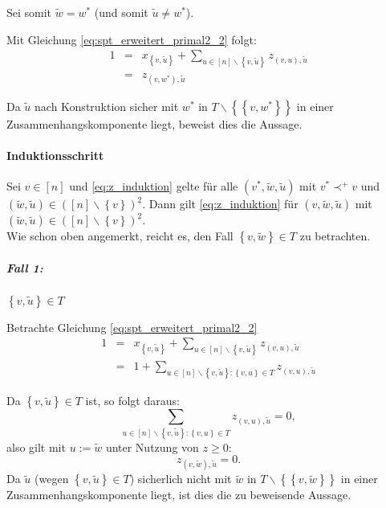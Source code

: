 \documentclass[10p,a4paper,BCOR = 12mm, DIV=15]{scrbook}
\begin{document}
{\begin{bew}
Sei somit $\widetilde{w} = w^*$ (und somit $\widetilde{u}\neq w^*$).

Mit Gleichung \eqref{eq:spt_erweitert_primal2_2} folgt:
\begin{eqnarray*}
1 & = & x_{\left\{v, \widetilde{u}\right\}} + \sum_{u\in[n]\backslash\left\{v, \widetilde{u}\right\}} z_{\left(v, u\right), \widetilde{u}} \\
& = & z_{\left(v, w^*\right), \widetilde{u}}
\end{eqnarray*}

Da $\widetilde{u}$ nach Konstruktion sicher mit $w^*$ in $T\backslash \left\{\left\{v, w^*\right\}\right\}$ in einer Zusammenhangskomponente liegt, beweist dies die Aussage.

\paragraph{Induktionsschritt} Sei $v\in \left[n\right]$ und \eqref{eq:z_induktion} gelte für alle $\left(v^*, \widetilde{w}, \widetilde{u}\right)$ mit $v^*\prec^+ v$ und $\left(\widetilde{w}, \widetilde{u}\right)\in \left(\left[n\right]\backslash \left\{v\right\}\right)^{\underline{2}}$. Dann gilt \eqref{eq:z_induktion} für $\left(v, \widetilde{w}, \widetilde{u}\right)$ mit $\left(\widetilde{w}, \widetilde{u}\right)\in \left(\left[n\right]\backslash \left\{v\right\}\right)^{\underline{2}}$. \\

Wie schon oben angemerkt, reicht es, den Fall $\left\{v, \widetilde{w}\right\}\in T$ zu betrachten.

\subparagraph{Fall 1:} $\left\{v, \widetilde{u}\right\}\in T$

Betrachte Gleichung \eqref{eq:spt_erweitert_primal2_2}
\begin{eqnarray*}
1 & = & x_{\left\{v, \widetilde{u}\right\}} + \sum_{u\in[n]\backslash\left\{v, \widetilde{u}\right\}} z_{\left(v, u\right), \widetilde{u}} \\
& = & 1 + \sum_{u\in[n]\backslash\left\{v, \widetilde{u}\right\}: \left\{v, u\right\}\in T} z_{\left(v, u\right), \widetilde{u}}
\end{eqnarray*}

Da $\left\{v, \widetilde{u}\right\}\in T$ ist, so folgt daraus:
\begin{displaymath}
\sum_{u\in[n]\backslash\left\{v, \widetilde{u}\right\}: \left\{v, u\right\}\in T} z_{\left(v, u\right), \widetilde{u}} = 0,
\end{displaymath}
also gilt mit $u:=\widetilde{w}$ unter Nutzung von $z\geq 0$:
\begin{displaymath}
z_{\left(v, \widetilde{w}\right), \widetilde{u}} = 0.
\end{displaymath}
Da $\widetilde{u}$ (wegen $\left\{v, \widetilde{u}\right\}\in T$) sicherlich nicht mit $\widetilde{w}$ in $T\backslash \left\{\left\{v, \widetilde{w}\right\}\right\}$ in einer Zusammenhangskomponente liegt, ist dies die zu beweisende Aussage.


\end{bew}}
\end{document}
